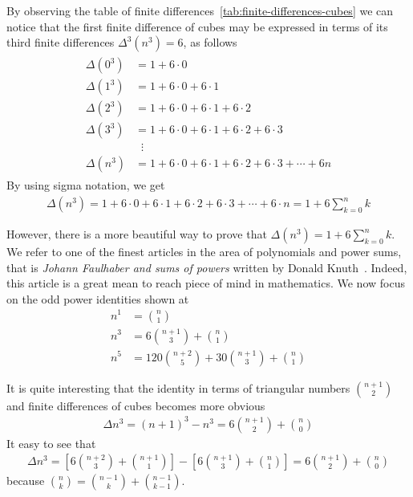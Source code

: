 By observing the table of finite differences~\eqref{tab:finite-differences-cubes} we can notice that
the first finite difference of cubes may be expressed in terms of its
third finite differences $\Delta^3(n^3) = 6$, as follows
\begin{align*}
    \begin{split}
        \Delta(0^3) &= 1+6 \cdot 0 \\
        \Delta(1^3) &= 1+6\cdot0+6\cdot1 \\
        \Delta(2^3) &= 1+6\cdot0+6\cdot1+6\cdot2 \\
        \Delta(3^3) &= 1+6\cdot0+6\cdot1+6\cdot2+6\cdot3 \\
        &\; \; \vdots \\
        \Delta(n^3) &= 1+6\cdot0+6\cdot1+6\cdot2+6\cdot3 + \cdots + 6n
    \end{split}
\end{align*}
By using sigma notation, we get
\begin{align*}
    \Delta(n^3) = 1+6\cdot0+6\cdot1+6\cdot2+6\cdot3+\cdots+6\cdot n = 1 + 6 \sum_{k=0}^{n} k
\end{align*}

However, there is a more beautiful way to prove that $\Delta(n^3) = 1 + 6 \sum_{k=0}^{n} k$.
We refer to one of the finest articles in the area of polynomials and power sums,
that is \textit{Johann Faulhaber and sums of powers} written by Donald Knuth~\cite{knuth1993johann}.
Indeed, this article is a great mean to reach piece of mind in mathematics.
We now focus on the odd power identities shown at~\cite[~p. 9]{knuth1993johann}
\begin{align*}
    n^1 &= \binom{n}{1} \\
    n^3 &= 6 \binom{n+1}{3} + \binom{n}{1} \\
    n^5 &= 120 \binom{n+2}{5} + 30 \binom{n+1}{3} + \binom{n}{1}
\end{align*}

It is quite interesting that the identity in terms of triangular numbers $\binom{n+1}{2}$
and finite differences of cubes becomes more obvious
\begin{align*}
    \Delta n^3
    = (n+1)^3 - n^3
    =  6 \binom{n+1}{2} + \binom{n}{0}
\end{align*}
It easy to see that
\begin{align*}
    \Delta n^3
    = \left[ 6 \binom{n+2}{3} + \binom{n+1}{1} \right] - \left[ 6 \binom{n+1}{3} + \binom{n}{1} \right]
    = 6 \binom{n+1}{2} + \binom{n}{0}
\end{align*}
because $\binom{n}{k} = \binom{n-1}{k} + \binom{n-1}{k-1}$.

